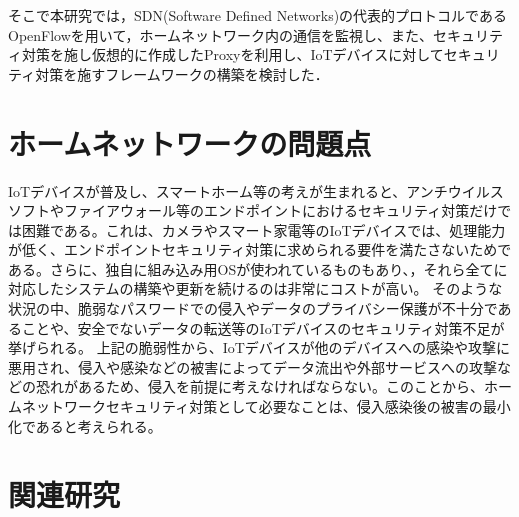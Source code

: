 \documentclass[Japanese]{dicomopapers}
\begin{document}
そこで本研究では，SDN(Software Defined Networks)の代表的プロトコルであるOpenFlow\cite{openflow}を用いて，ホームネットワーク内の通信を監視し、また、セキュリティ対策を施し仮想的に作成したProxyを利用し、IoTデバイスに対してセキュリティ対策を施すフレームワークの構築を検討した．

\section{ホームネットワークの問題点}
IoTデバイスが普及し、スマートホーム等の考えが生まれると、アンチウイルスソフトやファイアウォール等のエンドポイントにおけるセキュリティ対策だけでは困難である。これは、カメラやスマート家電等のIoTデバイスでは、処理能力が低く、エンドポイントセキュリティ対策に求められる要件を満たさないためである。さらに、独自に組み込み用OSが使われているものもあり、，それら全てに対応したシステムの構築や更新を続けるのは非常にコストが高い。
そのような状況の中、脆弱なパスワードでの侵入やデータのプライバシー保護が不十分であることや、安全でないデータの転送等のIoTデバイスのセキュリティ対策不足が挙げられる。
上記の脆弱性から、IoTデバイスが他のデバイスへの感染や攻撃に悪用され、侵入や感染などの被害によってデータ流出や外部サービスへの攻撃などの恐れがあるため、侵入を前提に考えなければならない。このことから、ホームネットワークセキュリティ対策として必要なことは、侵入感染後の被害の最小化であると考えられる。

\section{関連研究}
\end{document}

